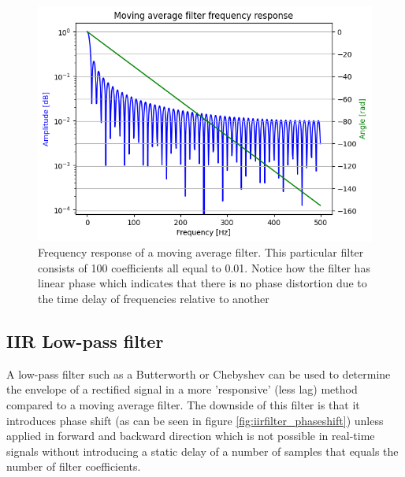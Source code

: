 \begin{figure}[h!t]
	\begin{center}
		\includegraphics[width=0.7\columnwidth]{images/movingaverage_phaseshift.png}
	\end{center}
	\caption{Frequency response of a moving average filter. This particular filter consists of 100 coefficients all equal to 0.01. Notice how the filter has linear phase which indicates that there is no phase distortion due to the time delay of frequencies relative to another \cite{fir_filter_properties}}
	\label{fig:movingaverage_phaseshift}
\end{figure}



\subsection{IIR Low-pass filter}
A low-pass filter such as a Butterworth or Chebyshev can be used to determine the envelope of a rectified signal in a more 'responsive' (less lag) method compared to a moving average filter. The downside of this filter is that it introduces phase shift (as can be seen in figure \ref{fig:iirfilter_phaseshift}) unless applied in forward and backward direction \cite{rose2011electromyogram} which is not possible in real-time signals without introducing a static delay of a number of samples that equals the number of filter coefficients.


